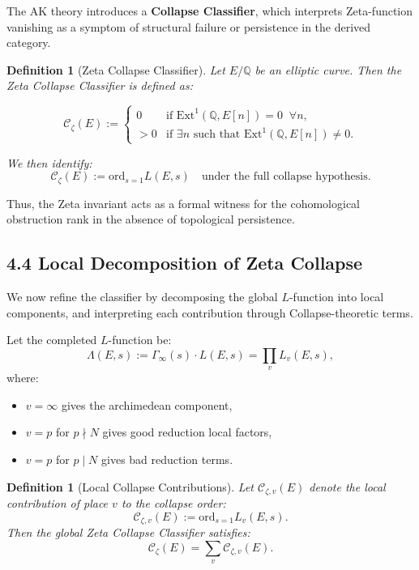 \documentclass[11pt]{article}
\newtheorem{definition}[theorem]{Definition}
\begin{document}
The AK theory introduces a \textbf{Collapse Classifier}, which interprets Zeta-function vanishing as a symptom of structural failure or persistence in the derived category.

\begin{definition}[Zeta Collapse Classifier]
Let $E/\mathbb{Q}$ be an elliptic curve.  
Then the \emph{Zeta Collapse Classifier} is defined as:

\[
\mathcal{C}_{\zeta}(E) := 
\begin{cases}
0 & \text{if } \mathrm{Ext}^1(\mathbb{Q},E[n]) = 0 \;\; \forall n, \\
> 0 & \text{if } \exists n \text{ such that } \mathrm{Ext}^1(\mathbb{Q},E[n]) \neq 0.
\end{cases}
\]

We then identify:
\[
\mathcal{C}_{\zeta}(E) := \mathrm{ord}_{s=1} L(E,s)
\quad \text{under the full collapse hypothesis.}
\]
\end{definition}

Thus, the Zeta invariant acts as a formal witness for the cohomological obstruction rank in the absence of topological persistence.

\subsection{4.4 Local Decomposition of Zeta Collapse}

We now refine the classifier by decomposing the global $L$-function into local components, and interpreting each contribution through Collapse-theoretic terms.

Let the completed $L$-function be:
\[
\Lambda(E,s) := \Gamma_\infty(s) \cdot L(E,s) = \prod_v L_v(E,s),
\]
where:
\begin{itemize}
  \item $v = \infty$ gives the archimedean component,
  \item $v = p$ for $p \nmid N$ gives good reduction local factors,
  \item $v = p$ for $p \mid N$ gives bad reduction terms.
\end{itemize}

\begin{definition}[Local Collapse Contributions]
Let $\mathcal{C}_{\zeta,v}(E)$ denote the local contribution of place $v$ to the collapse order:
\[
\mathcal{C}_{\zeta,v}(E) := \mathrm{ord}_{s=1} L_v(E,s).
\]
Then the global Zeta Collapse Classifier satisfies:
\[
\mathcal{C}_{\zeta}(E) = \sum_{v} \mathcal{C}_{\zeta,v}(E).
\]
\end{definition}
\end{document}
